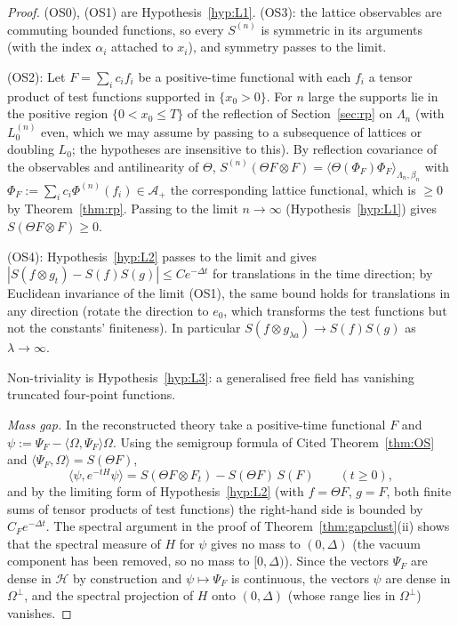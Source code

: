 \documentclass[11pt,a4paper]{article}
\theoremstyle{definition}
\theoremstyle{remark}
\newcommand{\cH}{\mathcal{H}}
\newcommand{\cA}{\mathcal{A}}
\newcommand{\ip}[2]{\langle #1,#2\rangle}
\begin{document}
\begin{proof}
(OS0), (OS1) are Hypothesis~\ref{hyp:L1}. (OS3): the lattice observables are commuting bounded functions, so every
$S^{(n)}$ is symmetric in its arguments (with the index $\alpha_i$ attached to $x_i$), and symmetry passes to the limit.

(OS2): Let $F=\sum_ic_if_i$ be a positive-time functional with each $f_i$ a tensor product of test functions supported
in $\{x_0>0\}$. For $n$ large the supports lie in the positive region $\{0<x_0\le T\}$ of the reflection of
Section~\ref{sec:rp} on $\Lambda_n$ (with $L^{(n)}_0$ even, which we may assume by passing to a subsequence of lattices
or doubling $L_0$; the hypotheses are insensitive to this). By reflection covariance of the observables and
antilinearity of $\Theta$, $S^{(n)}(\Theta F\otimes F)=\langle\Theta(\Phi_F)\Phi_F\rangle_{\Lambda_n,\beta_n}$ with
$\Phi_F:=\sum_ic_i\Phi^{(n)}(f_i)\in\cA_+$ the corresponding lattice functional, which is $\ge0$ by Theorem~\ref{thm:rp}.
Passing to the limit $n\to\infty$ (Hypothesis~\ref{hyp:L1}) gives $S(\Theta F\otimes F)\ge0$.

(OS4): Hypothesis~\ref{hyp:L2} passes to the limit and gives $|S(f\otimes g_t)-S(f)S(g)|\le Ce^{-\Delta t}$ for
translations in the time direction; by Euclidean invariance of the limit (OS1), the same bound holds for translations
in any direction (rotate the direction to $e_0$, which transforms the test functions but not the constants' finiteness).
In particular $S(f\otimes g_{\lambda a})\to S(f)S(g)$ as $\lambda\to\infty$.

Non-triviality is Hypothesis~\ref{hyp:L3}: a generalised free field has vanishing truncated four-point functions.

\emph{Mass gap.} In the reconstructed theory take a positive-time functional $F$ and
$\psi:=\Psi_F-\ip\Omega{\Psi_F}\Omega$. Using the semigroup formula of Cited Theorem~\ref{thm:OS} and
$\ip{\Psi_F}{\Omega}=S(\Theta F)$,
\[
\ip\psi{e^{-tH}\psi}=S(\Theta F\otimes F_t)-S(\Theta F)\,S(F)\qquad(t\ge0),
\]
and by the limiting form of Hypothesis~\ref{hyp:L2} (with $f=\Theta F$, $g=F$, both finite sums of tensor products of
test functions) the right-hand side is bounded by $C_Fe^{-\Delta t}$. The spectral argument in the proof of
Theorem~\ref{thm:gapclust}(ii) shows that the spectral measure of $H$ for $\psi$ gives no mass to $(0,\Delta)$
(the vacuum component has been removed, so no mass to $[0,\Delta)$). Since the vectors $\Psi_F$ are dense in $\cH$ by
construction and $\psi\mapsto\Psi_F$ is continuous, the vectors $\psi$ are dense in $\Omega^\perp$, and the spectral
projection of $H$ onto $(0,\Delta)$ (whose range lies in $\Omega^\perp$) vanishes.
\end{proof}
\end{document}
